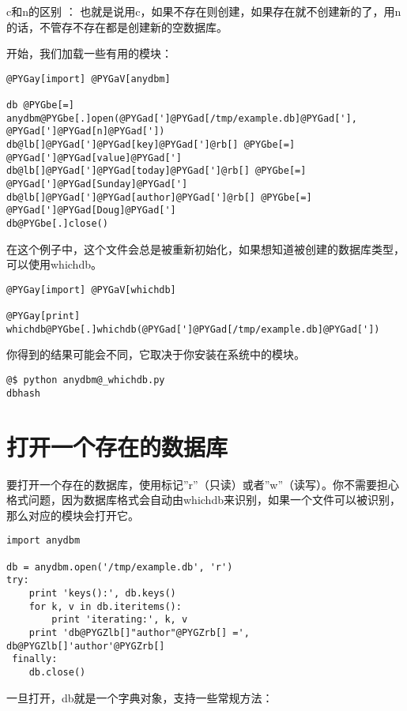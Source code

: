 \documentclass[a4paper,10pt,english]{manual}
\begin{document}
c和n的区别 ：
也就是说用c，如果不存在则创建，如果存在就不创建新的了，用n的话，不管存不存在都是创建新的空数据库。

开始，我们加载一些有用的模块：

\begin{Verbatim}[commandchars=@\[\]]
@PYGay[import] @PYGaV[anydbm]

db @PYGbe[=] anydbm@PYGbe[.]open(@PYGad[']@PYGad[/tmp/example.db]@PYGad['], @PYGad[']@PYGad[n]@PYGad['])
db@lb[]@PYGad[']@PYGad[key]@PYGad[']@rb[] @PYGbe[=] @PYGad[']@PYGad[value]@PYGad[']
db@lb[]@PYGad[']@PYGad[today]@PYGad[']@rb[] @PYGbe[=] @PYGad[']@PYGad[Sunday]@PYGad[']
db@lb[]@PYGad[']@PYGad[author]@PYGad[']@rb[] @PYGbe[=] @PYGad[']@PYGad[Doug]@PYGad[']
db@PYGbe[.]close()
\end{Verbatim}

在这个例子中，这个文件会总是被重新初始化，如果想知道被创建的数据库类型，可以使用whichdb。

\begin{Verbatim}[commandchars=@\[\]]
@PYGay[import] @PYGaV[whichdb]

@PYGay[print] whichdb@PYGbe[.]whichdb(@PYGad[']@PYGad[/tmp/example.db]@PYGad['])
\end{Verbatim}

你得到的结果可能会不同，它取决于你安装在系统中的模块。

\begin{Verbatim}[commandchars=@\[\]]
@$ python anydbm@_whichdb.py
dbhash
\end{Verbatim}


\section{打开一个存在的数据库}

要打开一个存在的数据库，使用标记''r''（只读）或者''w''（读写）。你不需要担心格式问题，因为数据库格式会自动由whichdb来识别，如果一个文件可以被识别，那么对应的模块会打开它。

\begin{Verbatim}[commandchars=@\[\]]
import anydbm

db = anydbm.open('/tmp/example.db', 'r')
try:
    print 'keys():', db.keys()
    for k, v in db.iteritems():
        print 'iterating:', k, v
    print 'db@PYGZlb[]"author"@PYGZrb[] =', db@PYGZlb[]'author'@PYGZrb[]
 finally:
    db.close()
\end{Verbatim}

一旦打开，db就是一个字典对象，支持一些常规方法：
\end{document}
